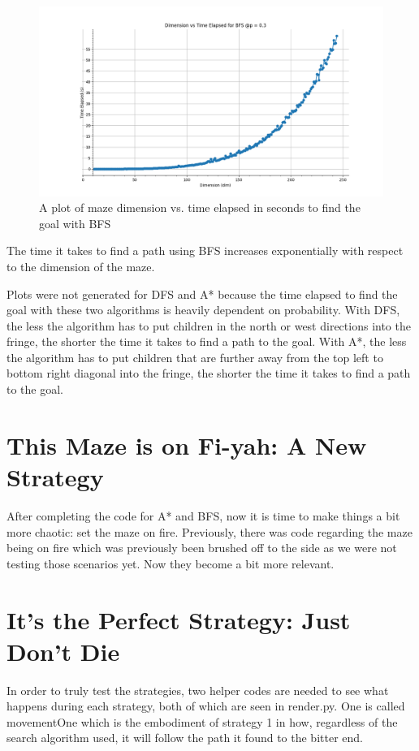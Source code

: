 \documentclass[11pt]{article}
\begin{document}
\begin{figure}[h]
\centering
\includegraphics[scale=0.5]{dimVStimeBFS_MAX243.PNG}
\caption{A plot of maze dimension vs. time elapsed in seconds to find the goal with BFS}
\label{BFStime}
\end{figure}
The time it takes to find a path using BFS increases exponentially with respect to the dimension of the maze.

Plots were not generated for DFS and A* because the time elapsed to find the goal with these two algorithms is heavily dependent on probability. With DFS, the less the algorithm has to put children in the north or west directions into the fringe, the shorter the time it takes to find a path to the goal. With A*, the less the algorithm has to put children that are further away from the top left to bottom right diagonal into the fringe, the shorter the time it takes to find a path to the goal.
	\pagebreak
\section{This Maze is on Fi-yah: A New Strategy}
After completing the code for A* and BFS, now it is time to make things a bit more chaotic: set the maze on fire. Previously, there was code regarding the maze being on fire which was previously been brushed off to the side as we were not testing those scenarios yet. Now they become a bit more relevant.
	\pagebreak
\section{It's the Perfect Strategy: Just Don't Die}
In order to truly test the strategies, two helper codes are needed to see what happens during each strategy, both of which are seen in render.py. One is called movementOne which is the embodiment of strategy 1 in how, regardless of the search algorithm used, it will follow the path it found to the bitter end.
\end{document}
